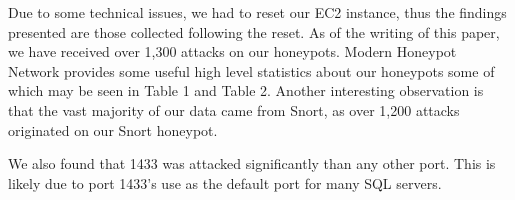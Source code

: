 Due to some technical issues, we had to reset our EC2 instance, thus the findings presented are those collected following the reset. As of the writing of this paper, we have received over 1,300 attacks on our honeypots. Modern Honeypot Network provides some useful high level statistics about our honeypots some of which may be seen in Table 1 and Table 2. Another interesting observation is that the vast majority of our data came from Snort, as over 1,200 attacks originated on our Snort honeypot.

We also found that 1433 was attacked significantly than any other port. This is likely due to port 1433's use as the default port for many SQL servers.


\begin{table}[H]
\caption{Top Five Individual Detected IP Addresses} \label{tab:ips}
\end{table}

\begin{table}[H]
\caption{Top Five Attacked Ports} \label{tab:ports}
\end{table}


